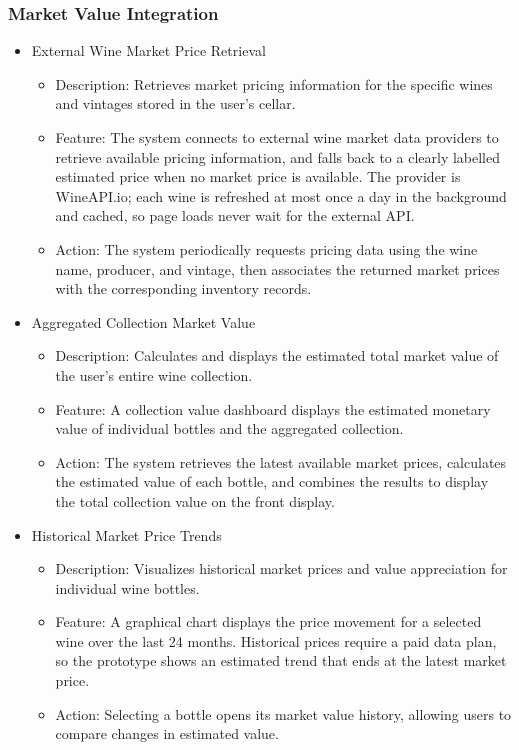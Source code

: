 \documentclass[conference]{IEEEtran}
\begin{document}
\subsubsection{Market Value Integration}
\begin{itemize}
    \item External Wine Market Price Retrieval
    \begin{itemize}
        \item Description: Retrieves market pricing information for the specific wines and vintages stored in the user's cellar.
        \item Feature: The system connects to external wine market data providers to retrieve available pricing information, and falls back to a clearly labelled estimated price when no market price is available. The provider is WineAPI.io; each wine is refreshed at most once a day in the background and cached, so page loads never wait for the external API.
        \item Action: The system periodically requests pricing data using the wine name, producer, and vintage, then associates the returned market prices with the corresponding inventory records.
    \end{itemize}

    \item Aggregated Collection Market Value
    \begin{itemize}
        \item Description: Calculates and displays the estimated total market value of the user's entire wine collection.
        \item Feature: A collection value dashboard displays the estimated monetary value of individual bottles and the aggregated collection.
        \item Action: The system retrieves the latest available market prices, calculates the estimated value of each bottle, and combines the results to display the total collection value on the front display.
    \end{itemize}

    \item Historical Market Price Trends
    \begin{itemize}
        \item Description: Visualizes historical market prices and value appreciation for individual wine bottles.
        \item Feature: A graphical chart displays the price movement for a selected wine over the last 24 months. Historical prices require a paid data plan, so the prototype shows an estimated trend that ends at the latest market price.
        \item Action: Selecting a bottle opens its market value history, allowing users to compare changes in estimated value.
    \end{itemize}
\end{itemize}
\end{document}
